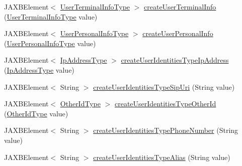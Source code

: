 \begin{DoxyCompactItemize}
JAXBElement$<$ \hyperlink{classcom_1_1telefonica_1_1schemas_1_1unica_1_1rest_1_1directory_1_1v1_1_1UserTerminalInfoType}{UserTerminalInfoType} $>$ \hyperlink{classcom_1_1telefonica_1_1schemas_1_1unica_1_1rest_1_1directory_1_1v1_1_1ObjectFactory_a8e9c09609548d1f2c65ed93be8069c96}{createUserTerminalInfo} (\hyperlink{classcom_1_1telefonica_1_1schemas_1_1unica_1_1rest_1_1directory_1_1v1_1_1UserTerminalInfoType}{UserTerminalInfoType} value)
\item 
JAXBElement$<$ \hyperlink{classcom_1_1telefonica_1_1schemas_1_1unica_1_1rest_1_1directory_1_1v1_1_1UserPersonalInfoType}{UserPersonalInfoType} $>$ \hyperlink{classcom_1_1telefonica_1_1schemas_1_1unica_1_1rest_1_1directory_1_1v1_1_1ObjectFactory_a38907a29de5465bbfd780f1a2d10bbcd}{createUserPersonalInfo} (\hyperlink{classcom_1_1telefonica_1_1schemas_1_1unica_1_1rest_1_1directory_1_1v1_1_1UserPersonalInfoType}{UserPersonalInfoType} value)
\item 
JAXBElement$<$ \hyperlink{classcom_1_1telefonica_1_1schemas_1_1unica_1_1rest_1_1common_1_1v1_1_1IpAddressType}{IpAddressType} $>$ \hyperlink{classcom_1_1telefonica_1_1schemas_1_1unica_1_1rest_1_1directory_1_1v1_1_1ObjectFactory_a6ff5bb7ae2916d173c29495b7ba407d6}{createUserIdentitiesTypeIpAddress} (\hyperlink{classcom_1_1telefonica_1_1schemas_1_1unica_1_1rest_1_1common_1_1v1_1_1IpAddressType}{IpAddressType} value)
\item 
JAXBElement$<$ String $>$ \hyperlink{classcom_1_1telefonica_1_1schemas_1_1unica_1_1rest_1_1directory_1_1v1_1_1ObjectFactory_afe6c44534e6d68148a54eb559af3f811}{createUserIdentitiesTypeSipUri} (String value)
\item 
JAXBElement$<$ \hyperlink{classcom_1_1telefonica_1_1schemas_1_1unica_1_1rest_1_1common_1_1v1_1_1OtherIdType}{OtherIdType} $>$ \hyperlink{classcom_1_1telefonica_1_1schemas_1_1unica_1_1rest_1_1directory_1_1v1_1_1ObjectFactory_acf0c1e6df1be093e5df8227476a0619c}{createUserIdentitiesTypeOtherId} (\hyperlink{classcom_1_1telefonica_1_1schemas_1_1unica_1_1rest_1_1common_1_1v1_1_1OtherIdType}{OtherIdType} value)
\item 
JAXBElement$<$ String $>$ \hyperlink{classcom_1_1telefonica_1_1schemas_1_1unica_1_1rest_1_1directory_1_1v1_1_1ObjectFactory_a6ddd0fc74267a60f394355842ad046c7}{createUserIdentitiesTypePhoneNumber} (String value)
\item 
JAXBElement$<$ String $>$ \hyperlink{classcom_1_1telefonica_1_1schemas_1_1unica_1_1rest_1_1directory_1_1v1_1_1ObjectFactory_adf3edb2934ccbfd2a7007f8982c90682}{createUserIdentitiesTypeAlias} (String value)

\end{DoxyCompactItemize}
